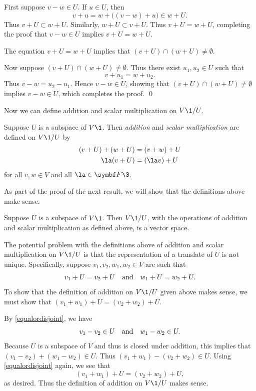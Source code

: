\proof
First suppose $v - w \in U$.  If $u \in U$, then
\[
v + u = w + \bigl((v - w) + u\bigr) \in w + U.
\]
Thus $v + U \subset w + U$. Similarly, $w + U \subset v + U$. Thus $v+U =w+U$, completing the proof that $v - w \in U$ implies
$v+U =w+U$.

The equation $v+U =w+U$ implies that $(v+U) \cap (w+U) \ne \emptyset$.

Now suppose $(v+U) \cap (w+U) \ne \emptyset$. Thus there exist $u_1, u_2 \in U$ such that
\[
v + u_1 = w + u_2.
\]
Thus $v-w = u_2 - u_1$. Hence $v - w \in U$, showing that $(v+U) \cap (w+U) \ne \emptyset$ implies $v - w \in U$, which completes the proof.
\qed

Now we can define addition and scalar multiplication on $V\1/U$.

{Suppose $U$ is a subspace of $V\1$. Then \emph{addition} and \emph{scalar multiplication} are defined on $V\1/U$ by
\begin{align*}
(v + U) + (w + U) &= (v+w) + U\\
\la(v + U) &= (\la v) + U
\end{align*}
for all $v, w \in V$ and all $\la \in \F{}\3$.
}

As part of the proof of the next result, we will show that the definitions above make sense.

{Suppose $U$ is a subspace of $V\1$. Then $V\1/U$, with the operations of addition and scalar multiplication as defined above, is a vector space.}

\proof
The potential problem with the definitions above of addition and scalar multiplication on $V\1/U$ is that the representation of a translate of $U$ is not unique. Specifically, suppose $v_1, v_2, w_1, w_2\in V$ are such that
\[
v_1 + U = v_2 + U \quad \text{and} \quad w_1 + U = w_2 + U.
\]
To show that the definition of addition on $V\1/U$ given above makes sense, we must show that $(v_1+w_1) + U = (v_2 + w_2) + U$.

By \ref{equalordisjoint}, we have
\[
v_1 - v_2 \in U \quad \text{and} \quad w_1 - w_2 \in U.
\]
Because $U$ is a subspace of $V$ and thus is closed under addition, this implies that
$(v_1 - v_2) + (w_1 - w_2) \in U$. Thus $(v_1 + w_1) - (v_2 + w_2) \in U$. Using \ref{equalordisjoint} again, we see that
\[
(v_1+w_1) + U = (v_2+w_2) + U,
\]
as desired. Thus the definition of addition on $V\1/U$ makes sense.

